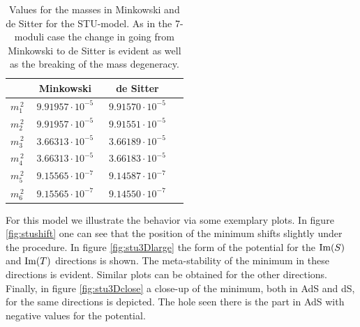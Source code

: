 \documentclass[a4paper,12pt,twoside,openright]{report}
\def\rmim{{\rm Im}}
\begin{document}
\begin{table}[htb]
\centering
\begin{tabular}{|c|c|c|c|}\hline
&  Minkowski  & de Sitter \\\hline
$m_1^{\,2}$ & $\; 9.91957 \cdot 10^{-5} \;$ & $\; 9.91570 \cdot 10^{-5} \;$ \\\hline
$m_2^{\,2}$ & $\; 9.91957 \cdot 10^{-5} \;$ & $\; 9.91551 \cdot 10^{-5} \;$ \\\hline
$m_3^{\,2}$ & $\; 3.66313 \cdot 10^{-5} \;$ & $\; 3.66189 \cdot 10^{-5} \;$ \\\hline
$m_4^{\,2}$ & $\; 3.66313 \cdot 10^{-5} \;$ & $\; 3.66183 \cdot 10^{-5} \;$ \\\hline
$m_5^{\,2}$ & $\; 9.15565 \cdot 10^{-7} \;$ & $\; 9.14587 \cdot 10^{-7} \;$ \\\hline
$m_6^{\,2}$ & $\; 9.15565 \cdot 10^{-7} \;$ & $\; 9.14550 \cdot 10^{-7} \;$ \\\hline
\end{tabular}
\caption{  Values for the masses in Minkowski and de Sitter for the STU-model. As in the 7-moduli case the change in  going from Minkowski to de Sitter is evident as well as the breaking of the mass degeneracy.}
\label{tab:stumass}
\end{table} For this model we illustrate the behavior via some exemplary plots. In figure \ref{fig:stushift} one can see that the position of the minimum shifts slightly under the procedure. In figure \ref{fig:stu3Dlarge} the form of the potential for the $\rmim(S)$ and $\rmim(T)$ directions is shown. The meta-stability of the minimum in these directions is evident. Similar plots can be obtained for the other directions. Finally, in figure \ref{fig:stu3Dclose} a close-up of the minimum, both in AdS and dS, for the same directions is depicted. The hole seen there is the part in AdS with negative values for the potential.
\end{document}
